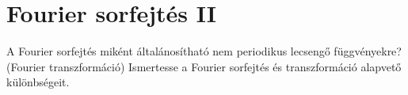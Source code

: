 \documentclass[../main.tex]{subfiles}
\begin{document}
\section{Fourier sorfejtés II}

\begin{fulltheorem}
	A Fourier sorfejtés miként általánosítható nem periodikus lecsengő
	függvényekre? (Fourier transzformáció) Ismertesse a Fourier sorfejtés
	és transzformáció alapvető különbségeit.
\end{fulltheorem}
\end{document}
